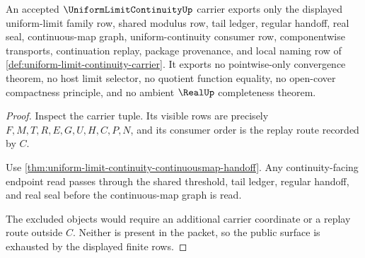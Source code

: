 \begin{theorem}
\label{thm:uniform-limit-continuity-nonescape}
An accepted $\UniformLimitContinuityUp$ carrier exports only the displayed uniform-limit family row, shared modulus row, tail ledger, regular handoff, real seal, continuous-map graph, uniform-continuity consumer row, componentwise transports, continuation replay, package provenance, and local naming row of \autoref{def:uniform-limit-continuity-carrier}. It exports no pointwise-only convergence theorem, no host limit selector, no quotient function equality, no open-cover compactness principle, and no ambient $\RealUp$ completeness theorem.
\end{theorem}
\begin{proof}
Inspect the carrier tuple. Its visible rows are precisely $F,M,T,R,E,G,U,H,C,P,N$, and its consumer order is the replay route recorded by $C$.

Use \autoref{thm:uniform-limit-continuity-continuousmap-handoff}. Any continuity-facing endpoint read passes through the shared threshold, tail ledger, regular handoff, and real seal before the continuous-map graph is read.

The excluded objects would require an additional carrier coordinate or a replay route outside $C$. Neither is present in the packet, so the public surface is exhausted by the displayed finite rows.
\end{proof}

\begin{closurestatus}{\UniformLimitContinuityUp}
  \theoryclosure{\seedClosure}
  \formalstatus{\unformalizedV}
\end{closurestatus}

